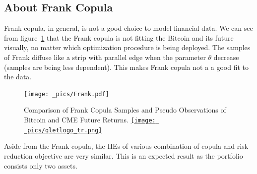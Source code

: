 \subsection{About Frank Copula}\label{subsec:Frank}
Frank-copula, in general, is not a good choice to model financial data.
We can see from figure~\ref{fig:Frank} that the Frank copula is not fitting the Bitcoin and its future visually, no matter
which optimization procedure is being deployed.
The samples of Frank diffuse like a strip with parallel edge when the parameter $\theta$ decrease (samples are being less dependent).
This makes Frank copula not a a good fit to the data.

\begin{figure}[th]
   \centering
   \texttt{[image: \_pics/Frank.pdf]}
   \caption{Comparison of Frank Copula Samples and Pseudo Observations of Bitcoin and CME Future Returns.
   \href{http://www.quantlet.com/}{\texttt{[image: \_pics/qletlogo\_tr.png]}}}
   \label{fig:Frank}
\end{figure} \medskip

Aside from the Frank-copula, the HEs of various combination of copula and risk reduction objective are very similar.
This is an expected result as the portfolio consists only two assets.





%
%

%


